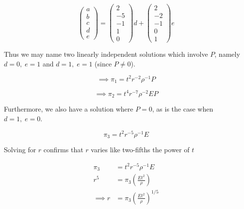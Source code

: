 \documentclass[12pt]{article}
\begin{document}
  \begin{equation}
    \begin{pmatrix}
      a \\ b \\ c \\ d \\ e
    \end{pmatrix}
    =
    \begin{pmatrix}
      2 \\ -5 \\ -1 \\ 1 \\ 0
    \end{pmatrix} d
    +
    \begin{pmatrix}
      2 \\ -2 \\ -1 \\ 0 \\ 1
    \end{pmatrix}
    e
  \end{equation}

  Thus we may name two linearly independent solutions which involve $P$, namely
  $d=0,\;e=1$ and $d=1,\;e=1$ (since $P\ne0$).

  \begin{multicols}{2}
    \begin{equation}
      \label{eq:4-p-ne-sol-1}
      \boxed{
        \implies \pi_1 = t^2r^{-2}\rho^{-1}P
      }
    \end{equation}

    \begin{equation}
      \label{eq:4-p-ne-sol-2}
      \boxed{
        \implies \pi_2 = t^4r^{-7}\rho^{-2}EP
      }
    \end{equation}
  \end{multicols}

  Furthermore, we also have a solution where $P=0$, as is the case when
  $d=1,\;e=0$.

  \begin{equation}
    \pi_3 = t^2r^{-5}\rho^{-1}E
  \end{equation}

  Solving for $r$ confirms that $r$ varies like two-fifths the power of $t$

  \begin{equation} \boxed{
      \begin{aligned}
        \pi_3 &= t^{2} r^{-5} \rho^{-1} E  \\
        r^5 &= \pi_3\left(\frac{Et^2}{\rho}\right) \\
        \implies r &= \pi_3{\left(\frac{Et^2}{\rho}\right)}^{1/5} \\
      \end{aligned}
    }
  \end{equation}
\end{document}
